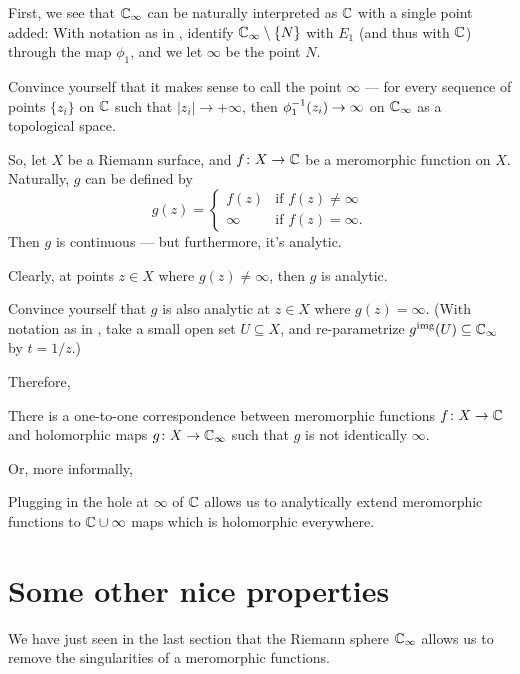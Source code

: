 First, we see that $\mathbb C_\infty$ can be naturally interpreted as $\mathbb C$ with a single point added:
With notation as in , identify $\mathbb C_\infty \setminus \{ N \}$ with $E_1$
(and thus with $\mathbb C$) through the map $\phi_1$, and we let $\infty$ be the point $N$.

\begin{ques}
	Convince yourself that it makes sense to call the point $\infty$ --- for every sequence of
	points $\{ z_i \}$ on $\mathbb C$ such that $|z_i| \to +\infty$, then $\phi_1^{-1}(z_i) \to \infty$
	on $\mathbb C_\infty$ as a topological space.
\end{ques}

So, let $X$ be a Riemann surface, and $f \colon X \to \mathbb C$ be a meromorphic function on $X$.
Naturally, $g$ can be defined by
\[ g(z) = \begin{cases}
	f(z) & \text{if }f(z) \neq \infty \\
	\infty & \text{if }f(z) = \infty.
\end{cases} \]
Then $g$ is continuous --- but furthermore, it's analytic.
\begin{ques}
	Clearly, at points $z \in X$ where $g(z) \neq \infty$, then $g$ is analytic.

	Convince yourself that $g$ is also analytic at $z \in X$ where $g(z) = \infty$.
	(With notation as in ,
	take a small open set $U \subseteq X$,
	and re-parametrize $g^{\text{img}}(U) \subseteq \mathbb C_\infty$ by $t = 1/z$.)
\end{ques}

Therefore,
\begin{proposition}
	There is a one-to-one correspondence between meromorphic functions $f \colon X \to \mathbb C$ and
	holomorphic maps $g \colon X \to \mathbb C_\infty$ such that $g$ is not identically $\infty$.
\end{proposition}
Or, more informally,
\begin{moral}
	Plugging in the hole at $\infty$ of $\mathbb C$ allows us to analytically extend meromorphic functions
	to $\mathbb C \cup \infty$ maps which is holomorphic everywhere.
\end{moral}

\section{Some other nice properties}

We have just seen in the last section that the Riemann sphere $\mathbb C_\infty$ allows us to remove the
singularities of a meromorphic functions.

